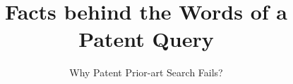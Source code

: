 \documentclass{sig-alternate}
\begin{document}
%

\title{ Facts behind the Words of a Patent Query
}
\subtitle{Why Patent Prior-art Search Fails?
}
%
%
%
%
%
\end{document}
